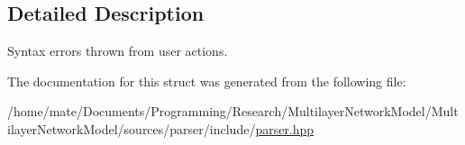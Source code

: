 \subsection{Detailed Description}
Syntax errors thrown from user actions. 

The documentation for this struct was generated from the following file\+:\begin{DoxyCompactItemize}
\item 
/home/mate/\+Documents/\+Programming/\+Research/\+Multilayer\+Network\+Model/\+Multilayer\+Network\+Model/sources/parser/include/\hyperlink{parser_8hpp}{parser.\+hpp}\end{DoxyCompactItemize}
